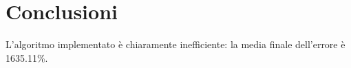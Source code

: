 \chapter*{Conclusioni}
\label{cha_conclusioni}

L'algoritmo implementato è chiaramente inefficiente: la media finale dell'errore è 1635.11\%. 